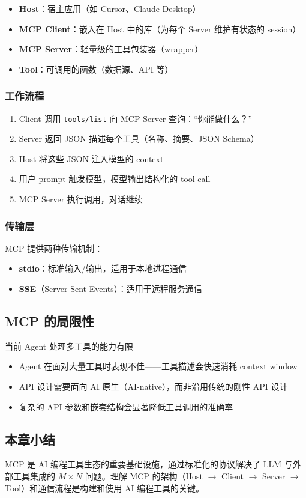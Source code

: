 \begin{itemize}
    \item \textbf{Host}：宿主应用（如 Cursor、Claude Desktop）
    \item \textbf{MCP Client}：嵌入在 Host 中的库（为每个 Server 维护有状态的 session）
    \item \textbf{MCP Server}：轻量级的工具包装器（wrapper）
    \item \textbf{Tool}：可调用的函数（数据源、API 等）
\end{itemize}

\subsubsection{工作流程}

\begin{enumerate}
    \item Client 调用 \texttt{tools/list} 向 MCP Server 查询：``你能做什么？''
    \item Server 返回 JSON 描述每个工具（名称、摘要、JSON Schema）
    \item Host 将这些 JSON 注入模型的 context
    \item 用户 prompt 触发模型，模型输出结构化的 tool call
    \item MCP Server 执行调用，对话继续
\end{enumerate}

\subsubsection{传输层}

MCP 提供两种传输机制：
\begin{itemize}
    \item \textbf{stdio}：标准输入/输出，适用于本地进程通信
    \item \textbf{SSE}（Server-Sent Events）：适用于远程服务通信
\end{itemize}

\subsection{MCP 的局限性}

\begin{warningbox}{当前 Agent 处理多工具的能力有限}
\begin{itemize}
    \item Agent 在面对大量工具时表现不佳——工具描述会快速消耗 context window
    \item API 设计需要面向 AI 原生（AI-native），而非沿用传统的刚性 API 设计
    \item 复杂的 API 参数和嵌套结构会显著降低工具调用的准确率
\end{itemize}
\end{warningbox}

\subsection{本章小结}

MCP 是 AI 编程工具生态的重要基础设施，通过标准化的协议解决了 LLM 与外部工具集成的 $M \times N$ 问题。理解 MCP 的架构（Host $\rightarrow$ Client $\rightarrow$ Server $\rightarrow$ Tool）和通信流程是构建和使用 AI 编程工具的关键。

